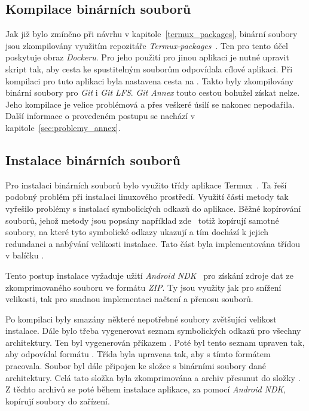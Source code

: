     \subsection{Kompilace binárních souborů}
    Jak již bylo zmíněno při návrhu v kapitole~\ref{termux_packages}, binární soubory jsou zkompilovány využitím repozitáře \emph{Termux-packages}~. Ten pro tento účel poskytuje obraz \emph{Dockeru}. Pro jeho použití pro jinou aplikaci je nutné upravit skript  tak, aby cesta ke spustitelným souborům odpovídala cílové aplikaci. Při kompilaci pro tuto aplikaci byla nastavena cesta  na . Takto byly zkompilovány binární soubory pro \emph{Git} i \emph{Git LFS}. \emph{Git Annex} touto cestou bohužel získat nelze. Jeho kompilace je velice problémová a přes veškeré úsilí se nakonec nepodařila. Další informace o provedeném postupu se nachází v kapitole~\ref{sec:problemy_annex}.

    \subsection{Instalace binárních souborů}
    Pro instalaci binárních souborů bylo využito třídy  aplikace Termux~. Ta řeší podobný problém při instalaci linuxového prostředí. Využití části metody  tak vyřešilo problémy s instalací symbolických odkazů do aplikace. Běžné kopírování souborů, jehož metody jsou popsány například zde~ totiž kopírují samotné soubory, na které tyto symbolické odkazy ukazují a tím dochází k jejich redundanci a nabývání velikosti instalace. Tato část byla implementována třídou  v balíčku .

    Tento postup instalace vyžaduje užití \emph{Android NDK}~ pro získání zdroje dat ze zkomprimovaného souboru ve formátu \emph{ZIP}. Ty jsou využity jak pro snížení velikosti, tak pro snadnou implementaci načtení a přenosu souborů.

    Po kompilaci byly smazány některé nepotřebné soubory zvětšující velikost instalace. Dále bylo třeba vygenerovat seznam symbolických odkazů pro všechny architektury. Ten byl vygenerován příkazem . Poté byl tento seznam upraven tak, aby odpovídal formátu . Třída  byla upravena tak, aby s tímto formátem pracovala. Soubor  byl dále připojen ke složce s binárními soubory dané architektury. Celá tato složka byla zkomprimována a archiv přesunut do složky . Z těchto archivů se poté během instalace aplikace, za pomocí \emph{Android NDK}, kopírují soubory do zařízení.

